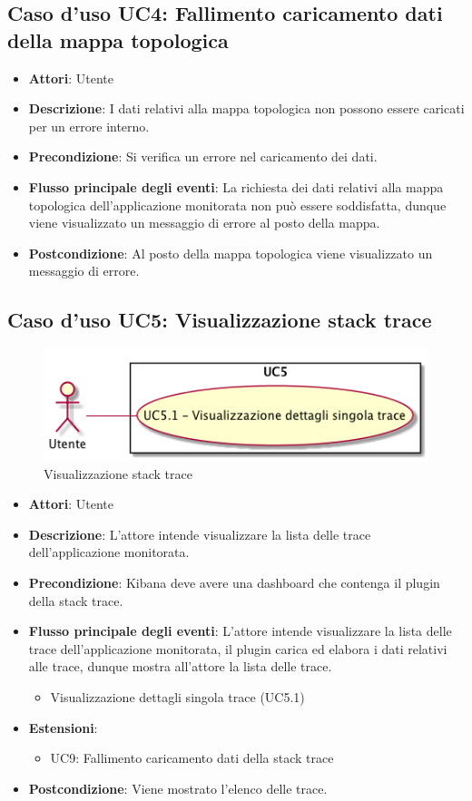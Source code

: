 \subsection{Caso d'uso UC4: Fallimento caricamento dati della mappa topologica}
\begin{itemize}
	\item \textbf{Attori}: Utente
	\item \textbf{Descrizione}: I dati relativi alla mappa topologica non possono essere caricati per un errore interno.
	
	\item \textbf{Precondizione}: Si verifica un errore nel caricamento dei dati.
	\item \textbf{Flusso principale degli eventi}: La richiesta dei dati relativi alla mappa topologica dell'applicazione monitorata non può essere soddisfatta, dunque viene visualizzato un messaggio di errore al posto della mappa.
	\item \textbf{Postcondizione}: Al posto della mappa topologica viene visualizzato un messaggio di errore.
\end{itemize}
\subsection{Caso d'uso UC5: Visualizzazione stack trace}
\begin{figure} [H]
	\centering
	\includegraphics[scale=0.45]{./UC/UC5.png}
	\caption{Visualizzazione stack trace}\label{}
\end{figure}
\begin{itemize}
	\item \textbf{Attori}: Utente
	\item \textbf{Descrizione}: L'attore intende visualizzare la lista delle trace dell'applicazione monitorata.
	\item \textbf{Precondizione}: Kibana deve avere una dashboard che contenga il plugin della stack trace.
	\item \textbf{Flusso principale degli eventi}: L'attore intende visualizzare la lista delle trace dell'applicazione monitorata, il plugin carica ed elabora i dati relativi alle trace, dunque mostra all'attore la lista delle trace.
	\begin{itemize}
		\item Visualizzazione dettagli singola trace (UC5.1)
	\end{itemize}
	\item 	\textbf{Estensioni}:
	\begin{itemize}
		\item UC9: Fallimento caricamento dati della stack trace
	\end{itemize}
	\item \textbf{Postcondizione}: Viene mostrato l'elenco delle trace.
\end{itemize}
